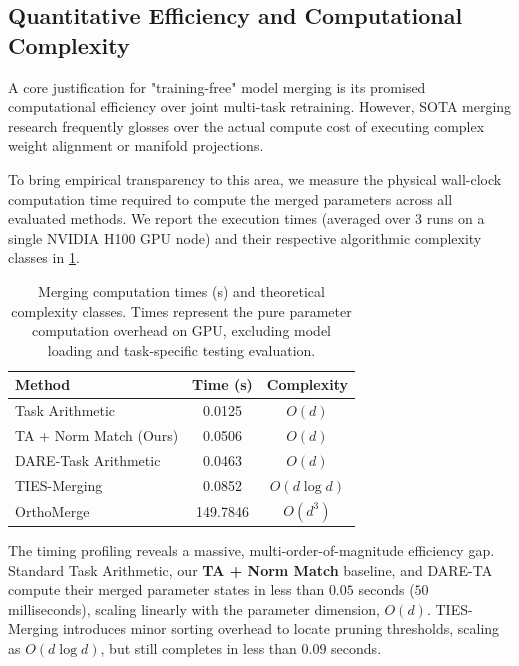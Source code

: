 \documentclass{article}
\begin{document}
\subsection{Quantitative Efficiency and Computational Complexity}

A core justification for "training-free" model merging is its promised computational efficiency over joint multi-task retraining. However, SOTA merging research frequently glosses over the actual compute cost of executing complex weight alignment or manifold projections. 

To bring empirical transparency to this area, we measure the physical wall-clock computation time required to compute the merged parameters across all evaluated methods. We report the execution times (averaged over 3 runs on a single NVIDIA H100 GPU node) and their respective algorithmic complexity classes in \cref{tab:timing_results}.

\begin{table}[h]
\caption{Merging computation times (s) and theoretical complexity classes. Times represent the pure parameter computation overhead on GPU, excluding model loading and task-specific testing evaluation.}
\label{tab:timing_results}
\vskip 0.05in
\begin{center}
\begin{small}
\begin{sc}
\begin{tabular}{lcc}
\toprule
Method & Time (s) & Complexity \\
\midrule
Task Arithmetic & 0.0125 & $O(d)$ \\
TA + Norm Match (Ours) & 0.0506 & $O(d)$ \\
DARE-Task Arithmetic & 0.0463 & $O(d)$ \\
TIES-Merging & 0.0852 & $O(d \log d)$ \\
OrthoMerge & 149.7846 & $O(d^3)$ \\
\bottomrule
\end{tabular}
\end{sc}
\end{small}
\end{center}
\vskip -0.15in
\end{table}

The timing profiling reveals a massive, multi-order-of-magnitude efficiency gap. Standard Task Arithmetic, our \textbf{TA + Norm Match} baseline, and DARE-TA compute their merged parameter states in less than $0.05$ seconds ($50$ milliseconds), scaling linearly with the parameter dimension, $O(d)$. TIES-Merging introduces minor sorting overhead to locate pruning thresholds, scaling as $O(d \log d)$, but still completes in less than $0.09$ seconds. 
\end{document}
